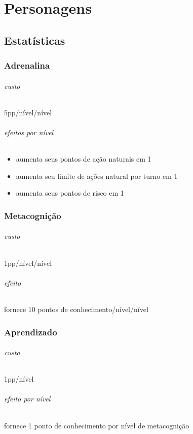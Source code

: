 \part{Personagens}
\chapter{Estatísticas}
\section{Adrenalina}
\paragraph{custo} 5pp/nível/nível
\paragraph{efeitos por nível}
\begin{itemize}
  \item aumenta seus pontos de ação naturais em 1
  \item aumenta seu limite de ações natural por turno em 1
  \item aumenta seus pontos de risco em 1
\end{itemize}
%
%
\section{Metacognição}
\paragraph{custo} 1pp/nível/nível
\paragraph{efeito} fornece 10 pontos de conhecimento/nível/nível
%
%
\section{Aprendizado}
\paragraph{custo} 1pp/nível
\paragraph{efeito por nível} fornece 1 ponto de conhecimento por nível de metacognição
%
%
